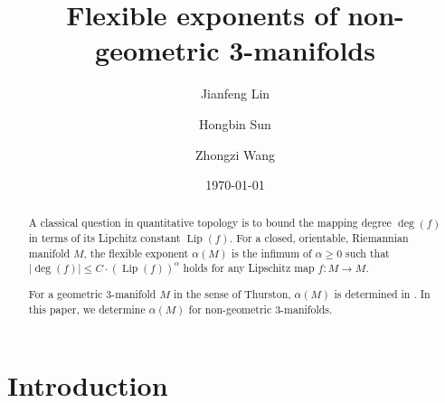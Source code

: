 \documentclass{amsart}
\title{Flexible exponents of non-geometric 3-manifolds}
\author{Jianfeng Lin}
\author{Hongbin Sun}
\author{Zhongzi Wang}
\date{\today}
\newcommand{\Z}{\mathbb{Z}}
\newcommand{\ra}{\rightarrow}
\newcommand{\lip}{\operatorname{Lip}}
\begin{document}

\maketitle

\begin{abstract}  
 A classical question in quantitative topology is to bound the mapping degree  $\operatorname{deg}(f)$ in terms of its Lipchitz constant $\operatorname{Lip}(f)$. For a closed, orientable, Riemannian manifold $M$, the flexible exponent $\alpha(M)$ is the infimum of  $\alpha\geqslant 0$ such that $|\deg (f)|\leqslant C\cdot (\lip (f))^\alpha$ holds for any Lipschitz map $f:M\ra M$. %
  
    For a geometric 3-manifold $M$ in the sense of Thurston,   $\alpha(M)$ is determined in \cite{DLWWW}.
In this paper, we determine $\alpha(M)$ for non-geometric 3-manifolds. %
\end{abstract}
    
    
\tableofcontents

\section{Introduction}
 

\end{document}
